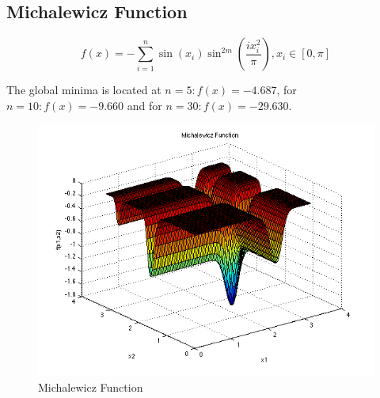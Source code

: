 \documentclass{article}
\begin{document}
\subsection{Michalewicz Function\cite{michal}}

$$
f(x) = - \sum_{i=1}^n \sin \left(x_i \right)\sin^{2m}\left(\frac{ix_i^2}{\pi}\right),
x_i \in \left[ 0 , \pi \right]$$

The global minima is located at $n=5: f (x) = -4.687$, for $n=10: f (x) = -9.660$ and for  $n=30: f (x) = -29.630$\cite{glob_min}.

\begin{figure}[!h]
  \centering
  \includegraphics[width=\textwidth,height=\textheight,keepaspectratio]{michal.png}
  \caption{Michalewicz Function\cite{michal_img}}
\end{figure}
\end{document}
